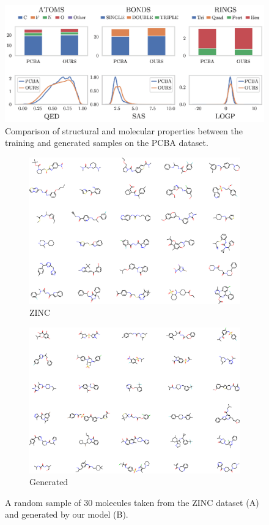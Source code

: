 \begin{figure}[h!]
    \centering
    \includegraphics[width=.95\textwidth]{Figures/Chapter7/props-pcba.eps}
    \caption{Comparison of structural and molecular properties between the training and generated samples on the PCBA dataset.}
    \label{fig:pcba-props}
\end{figure}
\begin{figure}[h!]
    \centering
    \begin{subfigure}[b]{0.49\textwidth}
        \centering
        \includegraphics[width=.9\textwidth]{Figures/Chapter7/samples.eps}
        \caption{ZINC}
        \label{fig:zinc-samples}
    \end{subfigure}
    \hfill
    \begin{subfigure}[b]{0.49\textwidth}
        \centering
        \includegraphics[width=.9\textwidth]{Figures/Chapter7/generated.eps}
        \caption{Generated}
        \label{fig:generated-samples}
    \end{subfigure}
       \caption{A random sample of 30 molecules taken from the ZINC dataset ({\scriptsize A}) and generated by our model ({\scriptsize B}).}
       \label{fig:samples}
\end{figure}